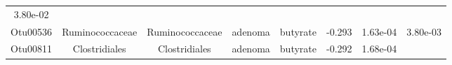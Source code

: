 \documentclass[11pt,]{article}
\begin{document}
\begin{longtable}[]{@{}cccccccc@{}}
\begin{minipage}[t]{0.08\columnwidth}
3.80e-02\strut
\end{minipage}\tabularnewline
\begin{minipage}[t]{0.08\columnwidth}\centering\strut
Otu00536\strut
\end{minipage} & \begin{minipage}[t]{0.15\columnwidth}\centering\strut
Ruminococcaceae\strut
\end{minipage} & \begin{minipage}[t]{0.15\columnwidth}\centering\strut
Ruminococcaceae\strut
\end{minipage} & \begin{minipage}[t]{0.08\columnwidth}\centering\strut
adenoma\strut
\end{minipage} & \begin{minipage}[t]{0.09\columnwidth}\centering\strut
butyrate\strut
\end{minipage} & \begin{minipage}[t]{0.07\columnwidth}\centering\strut
-0.293\strut
\end{minipage} & \begin{minipage}[t]{0.08\columnwidth}\centering\strut
1.63e-04\strut
\end{minipage} & \begin{minipage}[t]{0.08\columnwidth}\centering\strut
3.80e-03\strut
\end{minipage}\tabularnewline
\begin{minipage}[t]{0.08\columnwidth}\centering\strut
Otu00811\strut
\end{minipage} & \begin{minipage}[t]{0.15\columnwidth}\centering\strut
Clostridiales\strut
\end{minipage} & \begin{minipage}[t]{0.15\columnwidth}\centering\strut
Clostridiales\strut
\end{minipage} & \begin{minipage}[t]{0.08\columnwidth}\centering\strut
adenoma\strut
\end{minipage} & \begin{minipage}[t]{0.09\columnwidth}\centering\strut
butyrate\strut
\end{minipage} & \begin{minipage}[t]{0.07\columnwidth}\centering\strut
-0.292\strut
\end{minipage} & \begin{minipage}[t]{0.08\columnwidth}\centering\strut
1.68e-04\strut
\end{minipage} & \begin{minipage}[t]{0.08\columnwidth}\centering\strut

\end{minipage}
\end{longtable}
\end{document}
